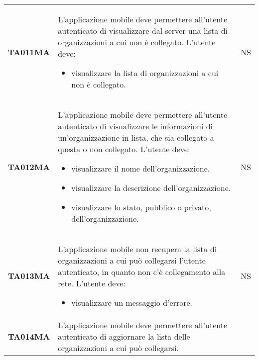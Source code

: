 \documentclass[../piano-di-qualifica.tex]{subfiles}
\begin{document}
\begin{longtable}[H]{>{\centering\bfseries}m{3cm} >{}m{10cm} >{\centering\arraybackslash}m{3cm}}
  TA011MA           & L'applicazione mobile deve permettere all'utente autenticato di visualizzare dal server una lista di organizzazioni a cui non è collegato. \newline
  L'utente deve:
  \begin{itemize}
    \item visualizzare la lista di organizzazioni a cui non è collegato.
  \end{itemize}
                    & NS                                                                                                                                                                                                                                                               \\
  TA012MA           & L'applicazione mobile deve permettere all'utente autenticato di visualizzare le informazioni di un'organizzazione in lista, che sia collegato a questa o non collegato. \newline
  L'utente deve:
  \begin{itemize}
    \item visualizzare il nome dell'organizzazione.
    \item visualizzare la descrizione dell'organizzazione.
    \item visualizzare lo stato, pubblico o privato, dell'organizzazione.
  \end{itemize}
                    & NS                                                                                                                                                                                                                                                               \\
  TA013MA           & L'applicazione mobile non recupera la lista di organizzazioni a cui può collegarsi l'utente autenticato, in quanto non c'è collegamento alla rete. \newline
  L'utente deve:
  \begin{itemize}
    \item visualizzare un messaggio d'errore.
  \end{itemize}
                    & NS                                                                                                                                                                                                                                                               \\
  TA014MA           & L'applicazione mobile deve permettere all'utente autenticato di aggiornare la lista delle organizzazioni a cui può collegarsi. \newline

\end{longtable}
\end{document}
